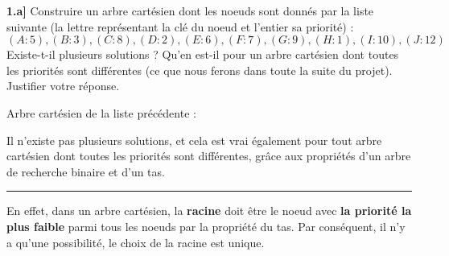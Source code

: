 \documentclass[a4paper,12pt]{report}
\begin{document}

\textbf{1.a]} Construire un arbre cartésien dont les noeuds sont donnés par la liste suivante (la lettre représentant la clé du noeud et l'entier sa priorité) :
\[
(A:5), (B:3), (C:8), (D:2), (E:6), (F:7), (G:9), (H:1), (I:10), (J:12)
\]
Existe-t-il plusieurs solutions ? Qu'en est-il pour un arbre cartésien dont toutes les priorités sont différentes (ce que nous ferons dans toute la suite du projet). 
    Justifier votre réponse.\\



\begin{tcolorbox}[colback=gray!10, colframe=blue!30, coltitle=black, title=Réponse à la 1.a - 1/2]
    
    Arbre cartésien de la liste précédente :\\


    \begin{center}
    \end{center}


    Il n'existe pas plusieurs solutions, et cela est vrai également pour tout arbre cartésien dont toutes les priorités sont différentes, grâce aux 
        propriétés d'un arbre de recherche binaire et d'un tas.


    \vspace{0.5cm}
    \hrule
    \vspace{0.5cm}


    En effet, dans un arbre cartésien, la \textbf{racine} doit être le noeud avec \textbf{la priorité la plus faible} parmi tous les noeuds par la propriété 
        du tas. Par conséquent, il n'y a qu'une possibilité, le choix de la racine est unique.


\end{tcolorbox}
\end{document}
